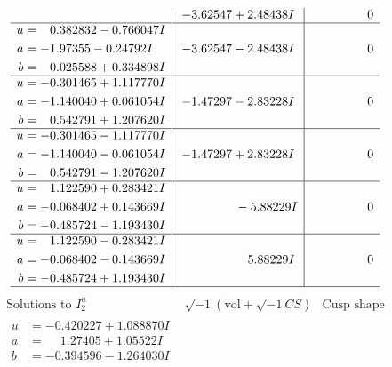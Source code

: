 \documentclass[1p]{elsarticle_modified}
\theoremstyle{definition}
\newcommand{\I}{\sqrt{-1}}
\begin{document}
$$\begin{array}{c|c|c}
 & -3.62547 + 2.48438 I & \phantom{-0.000000 } 0 \\ \hline\begin{aligned}
u &= \phantom{-}0.382832 - 0.766047 I \\
a &= -1.97355 - 0.24792 I \\
b &= \phantom{-}0.025588 + 0.334898 I\end{aligned}
 & -3.62547 - 2.48438 I & \phantom{-0.000000 } 0 \\ \hline\begin{aligned}
u &= -0.301465 + 1.117770 I \\
a &= -1.140040 + 0.061054 I \\
b &= \phantom{-}0.542791 + 1.207620 I\end{aligned}
 & -1.47297 - 2.83228 I & \phantom{-0.000000 } 0 \\ \hline\begin{aligned}
u &= -0.301465 - 1.117770 I \\
a &= -1.140040 - 0.061054 I \\
b &= \phantom{-}0.542791 - 1.207620 I\end{aligned}
 & -1.47297 + 2.83228 I & \phantom{-0.000000 } 0 \\ \hline\begin{aligned}
u &= \phantom{-}1.122590 + 0.283421 I \\
a &= -0.068402 + 0.143669 I \\
b &= -0.485724 - 1.193430 I\end{aligned}
 & \phantom{-0.000000 } -5.88229 I & \phantom{-0.000000 } 0 \\ \hline\begin{aligned}
u &= \phantom{-}1.122590 - 0.283421 I \\
a &= -0.068402 - 0.143669 I \\
b &= -0.485724 + 1.193430 I\end{aligned}
 & \phantom{-0.000000 -}5.88229 I & \phantom{-0.000000 } 0\\
 \hline 
 \end{array}$$\newpage$$\begin{array}{c|c|c}  
\text{Solutions to }I^u_{2}& \I (\text{vol} + \sqrt{-1}CS) & \text{Cusp shape}\\
 \hline 
\begin{aligned}
u &= -0.420227 + 1.088870 I \\
a &= \phantom{-}1.27405 + 1.05522 I \\
b &= -0.394596 - 1.264030 I\end{aligned}

\end{array}$$
\end{document}

